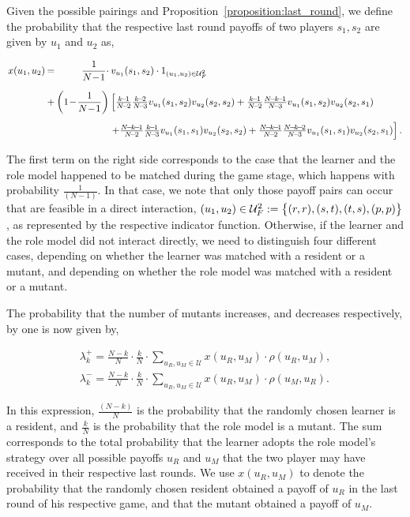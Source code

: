 \documentclass[11pt]{article}
\newcommand{\splitatcommas}[1]{%
  \begingroup
  \begingroup\lccode`~=`, \lowercase{\endgroup \edef~{\mathchar\the\mathcode`,
    \penalty0 \noexpand\hspace{0pt plus 1em}}%
  }\mathcode`,="8000 #1%
  \endgroup
}
\theoremstyle{plainCl1}
\theoremstyle{plainCl2}
\begin{document}
Given the possible pairings and Proposition~\ref{proposition:last_round}, we
define the probability that the respective last round payoffs of two players
\(s_1, s_2\) are given by $u_1$ and $u_2$ as,

\begin{equation}\label{eq:Chi}
\setlength{\arraycolsep}{1pt}
\begin{array}{llrl}
x(u_1,u_2)	 &=&\displaystyle \frac{1}{N\!-\!1}\cdot  &v_{u_1}(s_1,s_2)\cdot 1_{(u_1,u_2)\in \mathcal{U}^2_F}\\[0.5cm]
&+	
&\displaystyle \left(1\!-\!\frac{1}{N\!-\!1}\right)  
&\left[ \frac{k\!-\!1}{N\!-\!2}\frac{k\!-\!2}{N\!-\!3} v_{u_1}(s_1,s_2) v_{u_2}(s_2,s_2) + 
 \frac{k\!-\!1}{N\!-\!2}\frac{N\!-\!k\!-\!1}{N\!-\!3} v_{u_1}(s_1,s_2) v_{u_2}(s_2,s_1)\right.\\[0.5cm]
&&&\left. +\frac{N\!-\!k\!-\!1}{N\!-\!2}\frac{k\!-\!1}{N\!-\!3} v_{u_1}(s_1,s_1) v_{u_2}(s_2,s_2) + 
 \frac{N\!-\!k\!-\!1}{N\!-\!2}\frac{N\!-\!k\!-\!2}{N\!-\!3} v_{u_1}(s_1,s_1) v_{u_2}(s_2,s_1)\right].
\end{array}
\end{equation}

The first term on the right side corresponds to the case that the learner and
the role model happened to be matched during the game stage, which happens with
probability $\frac{1}{(N\!-\!1)}$. In that case, we note that only those payoff
pairs can occur that are feasible in a direct interaction,
$\splitatcommas{(u_1,u_2)\in \mathcal{U}^2_F:=\big\{ (r, r), (s, t), (t, s), (p, p)
\big\}}$, as represented by the respective indicator function. Otherwise, if the
learner and the role model did not interact directly, we need to distinguish
four different cases, depending on whether the learner was matched with a
resident or a mutant, and depending on whether the role model was matched with a
resident or a mutant.

The probability that the number of mutants increases, and decreases respectively,
by one is now given by,

\begin{align}
\lambda^+_k=\frac{N\!-\!k}{N}\cdot \frac{k}{N}\cdot \sum_{u_{R},u_{M}\in\mathcal{U}} x(u_{R},u_{M})\cdot \rho(u_{R},u_{M}), \\
\lambda^-_k=\frac{N\!-\!k}{N}\cdot \frac{k}{N}\cdot \sum_{u_{R},u_{M}\in\mathcal{U}} x(u_{R},u_{M})\cdot \rho(u_{M},u_{R}).
\end{align}

In this expression, $\frac{(N\!-\!k)}{N}$ is the probability that the randomly
chosen learner is a resident, and $\frac{k}{N}$ is the probability that the role
model is a mutant. The sum corresponds to the total probability that the learner
adopts the role model's strategy over all possible payoffs $u_R$ and $u_M$ that
the two player may have received in their respective last rounds. We use
$x(u_R,u_M)$ to denote the probability that the randomly chosen resident
obtained a payoff of $u_R$ in the last round of his respective game, and that
the mutant obtained a payoff of $u_M$.
\end{document}
